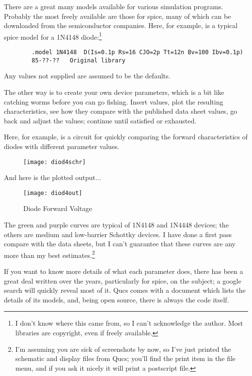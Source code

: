 \addvspace{12pt}

There are a great many models available for various simulation
programs. Probably the most freely available are those for spice, many
of which can be downloaded from the semiconductor companies. Here, for
example, is a typical spice model for a 1N4148 diode:\footnote{I don't
know where this came from, so I can't acknowledge the author. Most
libraries are copyright, even if freely available.}

\begin{verbatim}
        .model 1N4148  D(Is=0.1p Rs=16 CJO=2p Tt=12n Bv=100 Ibv=0.1p)
        85-??-??   Original library
\end{verbatim}

Any values not supplied are assumed to be the defaults.

\addvspace{12pt}

The other way is to create your own device parameters, which is a bit
like catching worms before you can go fishing. Insert values, plot the
resulting characteristics, see how they compare with the published
data sheet values, go back and adjust the values; continue until
satisfied or exhausted.

\addvspace{12pt}

Here, for example, is a circuit for quickly comparing the forward
characteristics of diodes with different parameter values.
\begin{figure}[ht]
  \centering
  \texttt{[image: diod4schr]}
  \label{fig:diod4schr}
\end{figure}
\FloatBarrier

And here is the plotted output...
\begin{figure}[ht]
  \centering
  \texttt{[image: diod4out]}
  \label{fig:diod4out}
  \caption{Diode Forward Voltage}
\end{figure}
\FloatBarrier

The green and purple curves are typical of 1N4148 and 1N4448 devices;
the others are medium and low-barrier Schottky devices. I have done a
first pass compare with the data sheets, but I can't guarantee that
these curves are any more than my best estimates.\footnote{I'm
assuming you are sick of screenshots by now, so I've just printed the
schematic and display files from Qucs; you'll find the print item in
the file menu, and if you ask it nicely it will print a postscript
file.}

\addvspace{12pt}

If you want to know more details of what each parameter does, there
has been a great deal written over the years, particularly for spice,
on the subject; a google search will quickly reveal most of it.  Qucs
comes with a document which lists the details of its models, and,
being open source, there is always the code itself.

